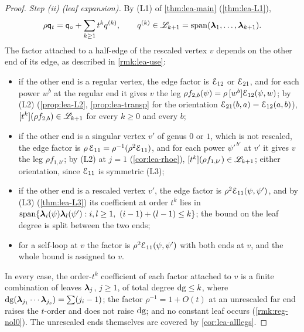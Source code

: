 \begin{proof}
\emph{Step (ii) (leaf expansion).} By (L1) of \cref{thm:lea-main} (\cref{thm:lea-L1}),
\[
\rho\mathsf{q}_{t}=\mathsf{q}_{\circ}+\sum_{k\geq 1}t^kq^{(k)},\qquad q^{(k)}\in\mathscr{L}_{k+1}=\operatorname{span}(\boldsymbol{\lambda}_1,\dots,\boldsymbol{\lambda}_{k+1}).
\]
The factor attached to a half-edge of the rescaled vertex $v$ depends on the other end of its edge, as described in \cref{rmk:lea-use}:
\begin{itemize}
\item if the other end is a regular vertex, the edge factor is $\mathcal{E}_{12}$ or $\mathcal{E}_{21}$, and for each power $w^b$ at the regular end it gives $v$ the leg $\rho f_{2,b}(\psi)=\rho\,[w^b]\mathcal{E}_{12}(\psi,w)$; by (L2) (\cref{prop:lea-L2}, \cref{prop:lea-transp} for the orientation $\mathcal{E}_{21}(b,a)=\mathcal{E}_{12}(a,b)$), $[t^k](\rho f_{2,b})\in\mathscr{L}_{k+1}$ for every $k\geq 0$ and every $b$;
\item if the other end is a singular vertex $v'$ of genus $0$ or $1$, which is not rescaled, the edge factor is $\rho\,\mathcal{E}_{11}=\rho^{-1}(\rho^2\mathcal{E}_{11})$, and for each power $\psi'^{\,b'}$ at $v'$ it gives $v$ the leg $\rho f_{1,b'}$; by (L2) at $j=1$ (\cref{cor:lea-rhoe}), $[t^k](\rho f_{1,b'})\in\mathscr{L}_{k+1}$; either orientation, since $\mathcal{E}_{11}$ is symmetric (L3);
\item if the other end is a rescaled vertex $v'$, the edge factor is $\rho^2\mathcal{E}_{11}(\psi,\psi')$, and by (L3) (\cref{thm:lea-L3}) its coefficient at order $t^k$ lies in $\operatorname{span}\{\boldsymbol{\lambda}_i(\psi)\boldsymbol{\lambda}_l(\psi'):i,l\geq 1,\ (i-1)+(l-1)\leq k\}$; the bound on the leaf degree is split between the two ends;
\item for a self-loop at $v$ the factor is $\rho^2\mathcal{E}_{11}(\psi,\psi')$ with both ends at $v$, and the whole bound is assigned to $v$.
\end{itemize}
In every case, the order-$t^k$ coefficient of each factor attached to $v$ is a finite combination of leaves $\boldsymbol{\lambda}_j$, $j\geq 1$, of total degree $\mathrm{dg}\leq k$, where $\mathrm{dg}(\boldsymbol{\lambda}_{j_1}\cdots\boldsymbol{\lambda}_{j_s})=\sum(j_i-1)$; the factor $\rho^{-1}=1+O(t)$ at an unrescaled far end raises the $t$-order and does not raise $\mathrm{dg}$; and no constant leaf occurs (\cref{rmk:reg-nol0}). The unrescaled ends themselves are covered by \cref{cor:lea-alllegs}.


\end{proof}
